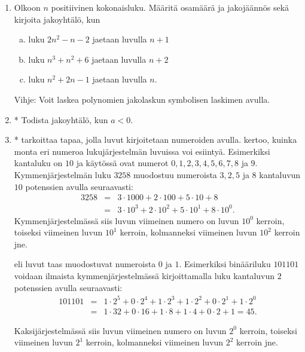 \begin{enumerate}
\item Olkoon $n$ positiivinen kokonaisluku. Määritä osamäärä ja jakojäännös sekä kirjoita jakoyhtälö, kun
\begin{enumerate}[a)]
\item luku $2n^2 - n - 2$ jaetaan luvulla $n + 1$
\item luku $n^3 + n^2 + 6$ jaetaan luvulla $n + 2$
\item luku $n^2 + 2n - 1$ jaetaan luvulla $n$.
\end{enumerate}
Vihje: Voit laskea polynomien jakolaskun symbolisen laskimen avulla.

\item * %
Todista jakoyhtälö, kun $a<0$.

\item *
 tarkoittaa tapaa, jolla luvut kirjoitetaan numeroiden avulla.  kertoo, kuinka monta eri numeroa lukujärjestelmän luvuissa voi esiintyä. Esimerkiksi  kantaluku on $10$ ja käytössä ovat numerot $0, 1, 2, 3, 4, 5, 6, 7, 8$ ja $9$. Kymmenjärjestelmän luku $3258$ muodostuu numeroista $3, 2, 5$ ja $8$ kantaluvun $10$ potenssien avulla seuraavasti:
\begin{eqnarray*}
3258 &=&3\cdot 1000+2\cdot 100+5\cdot 10+8\\
&=& 3\cdot 10^3+2\cdot 10^2+5\cdot 10^1+8\cdot 10^0.
\end{eqnarray*}
Kymmenjärjestelmässä siis luvun viimeinen numero on luvun $10^0$ kerroin, toiseksi viimeinen luvun $10^1$ kerroin, kolmanneksi viimeinen luvun $10^2$ kerroin jne.

 eli  luvut taas muodostuvat numeroista $0$ ja $1$. Esimerkiksi binääriluku $101101$ voidaan ilmaista kymmenjärjestelmässä kirjoittamalla luku kantaluvun $2$ potenssien avulla seuraavasti:
\begin{eqnarray*}
101101&=&1\cdot2^5+0\cdot2^4+1\cdot2^3+1\cdot2^2+0\cdot2^1+1\cdot2^0 \\
&=& 1\cdot32+0\cdot16+1\cdot8+1\cdot4+0\cdot2+1=45.
\end{eqnarray*}

\newpage

Kaksijärjestelmässä siis luvun viimeinen numero on luvun $2^0$ kerroin, toiseksi viimeinen luvun $2^1$ kerroin, kolmanneksi viimeinen luvun $2^2$ kerroin jne.


\end{enumerate}
